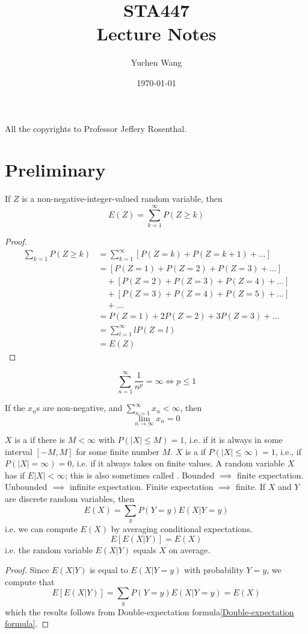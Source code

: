 \documentclass[11pt]{article}
\title{STA447\\ Lecture Notes}
\author{Yuchen Wang}
\date{\today}
\renewcommand{\limit}[1]{\underset{{#1} \rightarrow \infty}{\lim}}
\begin{document}
    \maketitle
    \tableofcontents
    \newpage
    \noindent All the copyrights to Professor Jeffery Rosenthal.
    \section{Preliminary}
    \proposition If $Z$ is a non-negative-integer-valued random variable, then
    $$E(Z) = \sum_{k=1}^\infty P(Z \geq k)$$
    \begin{proof}
    \begin{align*}
   	\sum_{k=1}P(Z \geq k) &= \sum_{k=1}^\infty [P(Z= k) + P(Z = k+1) + \hdots] \\
    	&= [P(Z = 1) + P(Z = 2) + P(Z=3) + \hdots]\\
    	 &\quad + [P(Z = 2) + P(Z = 3) + P(Z = 4) + \hdots] \\
    	 &\quad + [P(Z = 3) + P(Z = 4) + P(Z = 5) + \hdots] \\
    	 &\quad + \hdots \\
    	&= P(Z=1) + 2P(Z=2) + 3P(Z=3) + \hdots\\
    	&= \sum_{l=1}^\infty l P(Z=l) \\
    	&= E(Z)
    \end{align*}
    \end{proof}
    
    \fact
    $$\sum_{n=1}^\infty \frac{1}{n^p} = \infty \iff p \leq 1$$
    
    \fact If the $x_n$s are non-negative, and $\sum_{n=1}^\infty x_n < \infty$, then $$\limit{n} x_n = 0$$
    
    $X$ is a  if there is $M < \infty$ with $P(|X| \leq M) = 1$, i.e. if it is always in some interval $[-M, M]$ for some finite number $M$.
    $X$ is a  if $P(|X| \leq \infty) = 1$, i.e., if $P(|X| = \infty) = 0$, i.e. if it  always takes on finite values.
    A random variable $X$ has  if $E|X| < \infty$; this is also sometimes called .
    \fact Bounded $\implies$ finite expectation.
    \fact Unbounded $\implies$ infinite expectation.
    \fact Finite expectation $\implies$ finite.
    If $X$ and $Y$ are discrete random variables, then
    $$E(X) = \sum_{y}P(Y=y)E(X|Y=y)$$
    i.e. we can compute $E(X)$ by averaging conditional expectations.
    $$E[E(X|Y)] = E(X)$$
    i.e. the random variable $E(X|Y)$ equals $X$ on average.
    \begin{proof}
    Since $E(X|Y)$ is equal to $E(X|Y=y)$ with probability $Y=y$, we compute that 
    $$E[E(X|Y)] = \sum_{y}P(Y=y)E(X|Y=y) = E(X)$$
    which the results follows from Double-expectation formula\ref{Double-expectation formula}.
    \end{proof}
    
\end{document}
